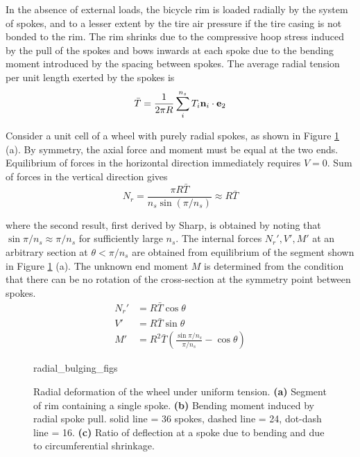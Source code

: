 \documentclass[\rootdir/thesis.tex]{subfiles}
\begin{document}
In the absence of external loads, the bicycle rim is loaded radially by the system of spokes, and to a lesser extent by the tire air pressure if the tire casing is not bonded to the rim\cite{Burgoyne}. The rim shrinks due to the compressive hoop stress induced by the pull of the spokes and bows inwards at each spoke due to the bending moment introduced by the spacing between spokes. The average radial tension per unit length exerted by the spokes is
\begin{equation}
\label{eq:Tbar}
\bar{T} = \frac{1}{2\pi R} \sum_i^{n_s} T_i \mathbf{n}_i \cdot\mathbf{e}_2
\end{equation}

Consider a unit cell of a wheel with purely radial spokes, as shown in Figure \ref{fig:radial_bulging} (a). By symmetry, the axial force and moment must be equal at the two ends. Equilibrium of forces in the horizontal direction immediately requires $V=0$. Sum of forces in the vertical direction gives
\begin{equation}
\label{eq:Nr}
N_r = \frac{\pi R\bar{T}}{n_s\sin{(\pi/n_s)}} \approx R\bar{T}
\end{equation}

where the second result, first derived by Sharp\cite{Sharp}, is obtained by noting that $\sin{\pi/n_s}\approx \pi/n_s$ for sufficiently large $n_s$. The internal forces $N_r',V',M'$ at an arbitrary section at $\theta < \pi/n_s$ are obtained from equilibrium of the segment shown in Figure \ref{fig:radial_bulging} (a). The unknown end moment $M$ is determined from the condition that there can be no rotation of the cross-section at the symmetry point between spokes.
\begin{subequations}
\begin{align}
\label{eq:NVM}
N_r' &= R\bar{T}\cos{\theta}\\
V'   &= R\bar{T}\sin{\theta}\\
M'   &= R^2\bar{T} \left( \frac{\sin{\pi/n_s}}{\pi/n_s} - \cos{\theta} \right)
\end{align}
\end{subequations}

\begin{figure}
\centering
{radial_bulging_figs}
\caption{Radial deformation of the wheel under uniform tension. \textbf{(a)} Segment of rim containing a single spoke. \textbf{(b)} Bending moment induced by radial spoke pull. solid line = 36 spokes, dashed line = 24, dot-dash line = 16. \textbf{(c)} Ratio of deflection at a spoke due to bending and due to circumferential shrinkage.}
\label{fig:radial_bulging}
\end{figure}
\end{document}
